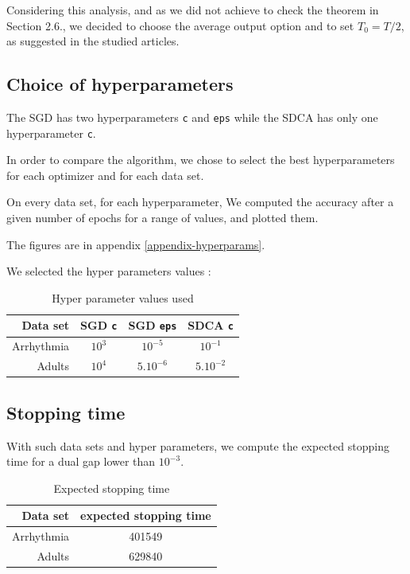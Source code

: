 \documentclass{article}
\begin{document}

Considering this analysis, and as we did not achieve to check the theorem in Section 2.6., we decided to choose the average output option and to set $T_0 = T/2$, as suggested in the studied articles.

\subsection{Choice of hyperparameters}

The SGD has two hyperparameters \texttt{c} and \texttt{eps} while the SDCA has only one hyperparameter \texttt{c}.

In order to compare the algorithm, we chose to select the best hyperparameters for each optimizer and for each data set.

On every data set, for each hyperparameter, We computed the accuracy after a given number of epochs for a range of values, and plotted them.

The figures are in appendix \ref{appendix-hyperparams}.

We selected the hyper parameters values :

\begin{table}[H]
	\centering
	\begin{tabular}{rccc}
		\toprule
		Data set   & SGD \texttt{c} & SGD \texttt{eps} & SDCA \texttt{c}\\
		\midrule
		Arrhythmia & $10^3$         & $10^{-5}$        & $10^{-1}$      \\
		Adults     & $10^4$         & $5.10^{-6}       $ & $5.10^{-2}$  \\
		\bottomrule
	\end{tabular}
	\caption{Hyper parameter values used}
\end{table}

\subsection{Stopping time}

With such data sets and hyper parameters, we compute the expected stopping time for a dual gap lower than $10^{-3}$.

\begin{table}[H]
	\centering
	\begin{tabular}{rc}
		\toprule
		Data set   & expected stopping time\\
		\midrule
		Arrhythmia & 401549                \\
		Adults     & 629840                \\
		\bottomrule
	\end{tabular}
	\caption{Expected stopping time}
\end{table}
\end{document}
